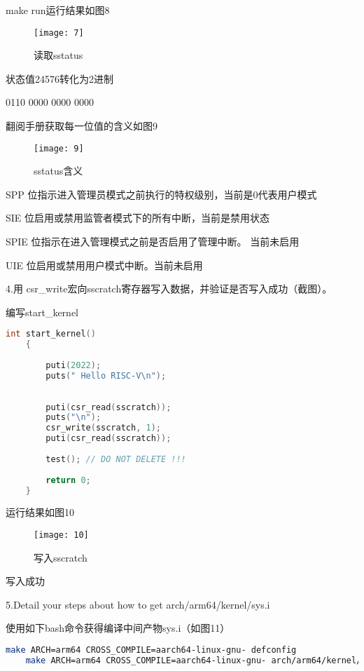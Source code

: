 \documentclass{source/Report}
\begin{document}
make run运行结果如图8

\begin{figure}[p]
    \centering
    \texttt{[image: 7]}
    \caption{读取sstatus}
\end{figure}

状态值24576转化为2进制

0110 0000 0000 0000

翻阅手册获取每一位值的含义如图9

\begin{figure}[p]
    \centering
    \texttt{[image: 9]}
    \caption{sstatus含义}
\end{figure}

SPP 位指示进入管理员模式之前执行的特权级别，当前是0代表用户模式

SIE 位启用或禁用监管者模式下的所有中断，当前是禁用状态

SPIE 位指示在进入管理模式之前是否启用了管理中断。 当前未启用

UIE 位启用或禁用用户模式中断。当前未启用

4.用 csr\_write宏向sscratch寄存器写入数据，并验证是否写入成功（截图）。

编写start\_kernel

\begin{lstlisting}[language = c, title = {验证}]
    int start_kernel()
    {
    
        puti(2022);
        puts(" Hello RISC-V\n");
    
    
        puti(csr_read(sscratch));
        puts("\n");
        csr_write(sscratch, 1);
        puti(csr_read(sscratch));
    
        test(); // DO NOT DELETE !!!
    
        return 0;
    }
\end{lstlisting}

运行结果如图10

\begin{figure}[p]
    \centering
    \texttt{[image: 10]}
    \caption{写入sscratch}
\end{figure}

写入成功

5.Detail your steps about how to get arch/arm64/kernel/sys.i

使用如下bash命令获得编译中间产物sys.i（如图11）

\begin{lstlisting}[language = bash, title = {获取sys.i}]
    make ARCH=arm64 CROSS_COMPILE=aarch64-linux-gnu- defconfig
    make ARCH=arm64 CROSS_COMPILE=aarch64-linux-gnu- arch/arm64/kernel/sys.i
\end{lstlisting}
\end{document}
